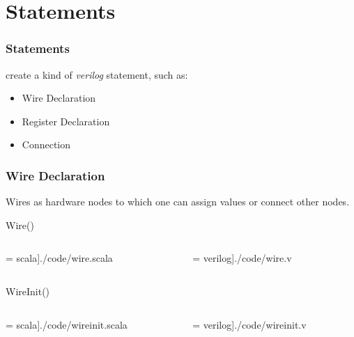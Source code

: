 \section{Statements}

\begin{frame}
  \frametitle{Statements}

   create a kind of \emph{verilog} statement, such as:
    \begin{itemize}
      \item {Wire Declaration}
      \item {Register Declaration}
      \item {Connection}
    \end{itemize}

\end{frame}

\begin{frame}[fragile]
  \frametitle{Wire Declaration}
  Wires as hardware nodes to which one can assign values or connect other nodes.	

  \begin{block}{Wire()}
    \begin{columns}[T]
      \begin{column}{0.5\textwidth}
         = scala]{./code/wire.scala }
      \end{column}
      \begin{column}{0.5\textwidth}
         = verilog]{./code/wire.v }
      \end{column}
    \end{columns}
  \end{block}

  \begin{block}{WireInit()}
    \begin{columns}[T]
      \begin{column}{0.5\textwidth}
         = scala]{./code/wireinit.scala }
      \end{column}
      \begin{column}{0.5\textwidth}
         = verilog]{./code/wireinit.v }
      \end{column}
    \end{columns}
  \end{block}
\end{frame}

